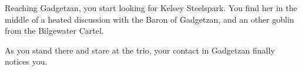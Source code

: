 Reaching Gadgetzan, you start looking for Kelsey Steelspark. You find her in the middle of a heated discussion with the Baron of Gadgetzan, and an other goblin from the Bilgewater Cartel.


As you stand there and stare at the trio, your contact in Gadgetzan finally notices you.


